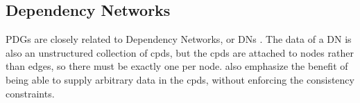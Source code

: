 \documentclass{article}
\begin{document}
	\begin{wip}
	\subsection{Dependency Networks}
	
	PDGs are closely related to Dependency Networks, or DNs
	\cite{heckerman2000dependency}. The data of a DN is also an unstructured
	collection of cpds, but the cpds are attached to nodes rather than edges, so
	there must be exactly one per node.  \citeauthor{heckerman2000dependency} also
	emphasize the benefit of being able to supply arbitrary data in the cpds,
	without enforcing the consistency constraints.
	

\end{wip}
\end{document}

